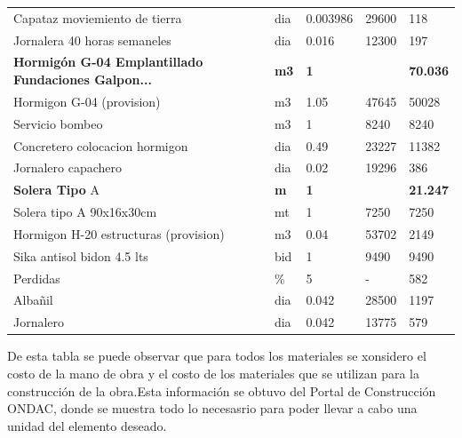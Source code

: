 \documentclass{article} %
\begin{document}
\begin{table}[H]
\begin{tabular}{lllll}
                         Capataz moviemiento de tierra &    dia &  0.003986 &           29600 &          118 \\
                          Jornalera 40 horas semaneles &    dia &     0.016 &           12300 &          197 \\
    \textbf{Hormigón G-04 Emplantillado Fundaciones Galpon...} & \textbf{m3} & \textbf{1} & \textbf{} & \textbf{70.036} \\
                             Hormigon G-04 (provision) &     m3 &      1.05 &           47645 &        50028 \\
                                       Servicio bombeo &     m3 &         1 &            8240 &         8240 \\
                        Concretero colocacion hormigon &    dia &      0.49 &           23227 &        11382 \\
                                   Jornalero capachero &    dia &      0.02 &           19296 &          386 \\
                                   \textbf{Solera Tipo} A & \textbf{m} & \textbf{1} & \textbf{} & \textbf{21.247} \\
                              Solera tipo A 90x16x30cm &     mt &         1 &            7250 &         7250 \\
                 Hormigon H-20 estructuras (provision) &     m3 &      0.04 &           53702 &         2149 \\
                            Sika antisol bidon 4.5 lts &    bid &         1 &            9490 &         9490 \\
                                              Perdidas &      \% &         5 &               - &          582 \\
                                               Albañil &    dia &     0.042 &           28500 &         1197 \\
                                             Jornalero &    dia &     0.042 &           13775 &          579 \\
    \bottomrule
    \end{tabular}
\end{table}

De esta tabla se puede observar que para todos los materiales se xonsidero el costo de la mano de obra y el costo de los materiales que se utilizan para la construcción de la obra.Esta información se obtuvo del Portal de Construcción ONDAC, donde se muestra todo lo necesasrio para poder llevar a cabo una unidad del elemento deseado.
\end{document}
